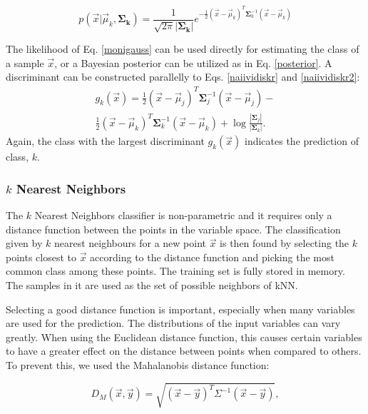 \documentclass[twoside]{article}
\renewcommand{\v}[1]{\vec{#1}}
\begin{document}
\begin{multicols}{2}
\begin{equation}\label{monigauss}
 p(\v{x}|\v{\mu}_k,\mathbf{\Sigma_k}) = \frac{1}{\sqrt{2\pi} |\mathbf{\Sigma_k}|}
 e^{-\frac{1}{2}(\v{x}-\v{\mu}_k)^T \mathbf{\Sigma}_k^{-1} (\v{x}-\v{\mu}_k)}
\end{equation}

The likelihood of Eq. \eqref{monigauss} can be used directly for estimating the class of a
sample $\v{x}$, or a Bayesian posterior can be utilized as in Eq. \eqref{posterior}. 
A discriminant can be constructed parallelly to Eqs. \eqref{naiividiskr} and \eqref{naiividiskr2}:
\begin{equation}
	\begin{aligned}
	 g_k(\v{x}) = \frac{1}{2}(\v{x}-\v{\mu}_j)^T \mathbf{\Sigma}_j^{-1} (\v{x}-\v{\mu}_j) - \\
	 \frac{1}{2}(\v{x}-\v{\mu}_k)^T \mathbf{\Sigma}_k^{-1} (\v{x}-\v{\mu}_k) 
	+\log \frac{|\mathbf{\Sigma}_j|}{|\mathbf{\Sigma}_k|}.
       \end{aligned}
\end{equation}
Again, the class with the largest discriminant $g_k(\v{x})$ indicates the prediction of class, $k$.

\subsubsection{$k$ Nearest Neighbors}\label{method:knn}

The $k$ Nearest Neighbors classifier is non-parametric and it requires only a
distance function between the points in the variable space.
The classification given by $k$ nearest neighbours for a new point $\v{x}$ is then found by 
selecting the $k$ points closest to $\v{x}$ according to the distance function and
picking the most common class among these points. The training set is fully
stored in memory. The samples in it are used as the set of possible neighbors of kNN.

Selecting a good distance function is important, especially when many variables
are used for the prediction. The distributions of the
input variables can vary greatly. When using the Euclidean distance function,
this causes certain variables to have a greater effect on the distance between
points when compared to others. To prevent this, we used the Mahalanobis
distance function\cite[p.~88]{Alpaydin}:

\begin{equation}\label{eq:mahalanobis}
  D_M(\v{x}, \v{y}) = \sqrt{(\v{x}-\v{y})^T \Sigma^{-1} (\v{x}-\v{y})},
\end{equation}


\end{multicols}
\end{document}
